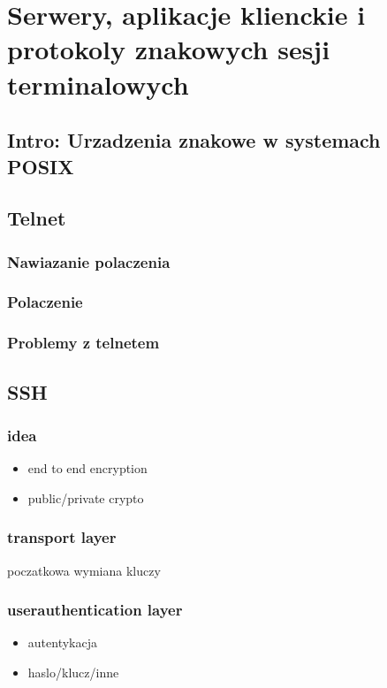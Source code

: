 \documentclass[11pt]{article}
\author{Patryk Kaniewski}
\date{\today}
\title{}
\begin{document}
\tableofcontents

\section{Serwery, aplikacje klienckie i protokoly znakowych sesji terminalowych}
\label{sec:org7a35478}
\subsection{Intro: Urzadzenia znakowe w systemach POSIX}
\label{sec:org3188df9}
\subsection{Telnet}
\label{sec:org71e5417}
\subsubsection{Nawiazanie polaczenia}
\label{sec:orge998fcf}
\subsubsection{Polaczenie}
\label{sec:org27536f4}
\subsubsection{Problemy z telnetem}
\label{sec:orgff1e95e}
\subsection{SSH}
\label{sec:orgf2e429b}
\subsubsection{idea}
\label{sec:orgbb65263}
\begin{itemize}
\item end to end encryption
\item public/private crypto
\end{itemize}
\subsubsection{transport layer}
\label{sec:org6c0fb18}
poczatkowa wymiana kluczy
\subsubsection{userauthentication layer}
\label{sec:orgc51a016}
\begin{itemize}
\item autentykacja
\item haslo/klucz/inne
\end{itemize}
\end{document}
